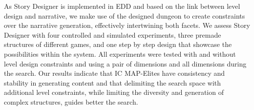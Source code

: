 As Story Designer is implemented in EDD and based on the link between level design and narrative, we make use of the designed dungeon to create constraints over the narrative generation, effectively intertwining both facets. We assess Story Designer with four controlled and simulated experiments, three premade structures of different games, and one step by step design that showcase the possibilities within the system. All experiments were tested with and without level design constraints and using a pair of dimensions and all dimensions during the search. Our results indicate that IC MAP-Elites have consistency and stability in generating content and that delimiting the search space with additional level constraints, while limiting the diversity and generation of complex structures, guides better the search.